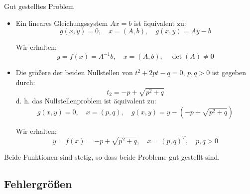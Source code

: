\begin{example}{Gut gestelltes Problem}

    \begin{itemize}
        \item Ein lineares Gleichungssystem $Ax = b$ ist äquivalent zu:
              \[
                  g(x, y) = 0, \quad x = (A, b), \quad g(x, y) = Ay - b
              \]

              Wir erhalten:
              \[
                  y = f(x) = A^{-1} b, \quad x = (A, b), \quad \det(A) \neq 0
              \]
        \item Die größere der beiden Nullstellen von $t^2 + 2pt - q = 0$, $p, q > 0$ ist gegeben durch:
              \[
                  t_2 = -p + \sqrt{p^2 + q}
              \]
              d. h. das Nullstellenproblem ist äquivalent zu:
              \[
                  g(x, y) = 0, \quad x = (p, q), \quad g(x, y) = y - (-p + \sqrt{p^2 + q})
              \]

              Wir erhalten:
              \[
                  y = f(x) = -p + \sqrt{p^2 + q}, \quad x = (p, q)^T, \quad p, q > 0
              \]
    \end{itemize}

    Beide Funktionen sind stetig, so dass beide Probleme gut gestellt sind.
\end{example}

\subsection{Fehlergrößen}

